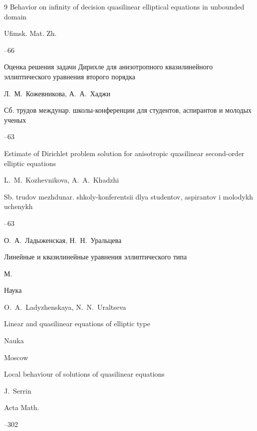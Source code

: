 \begin{thebibliography}{9}
\paper Behavior on infinity of decision quasilinear elliptical equations in unbounded domain

\jour Ufimsk. Mat. Zh.




--66






\paper Оценка решения задачи Дирихле для анизотропного квазилинейного эллиптического уравнения второго порядка

\by Л.~М.~Кожевникова, А.~А.~Хаджи

\jour Сб. трудов междунар. школы-конференции для студентов, аспирантов и молодых ученых



--63

\misctransl

\paper Estimate of Dirichlet problem solution  for anisotropic quasilinear second-order elliptic equations

 \by L.~M.~Kozhevnikova, A.~A.~Khadzhi  

\jour Sb. trudov mezhdunar. shkoly-konferentsii dlya studentov, aspirantov i molodykh uchenykh 



--63






\by О.~А.~Ладыженская, Н.~Н.~Уральцева

\book Линейные и квазилинейные уравнения эллиптического типа

\publaddr М.

\publ Наука



\misctransl

\by O.~A.~Ladyzhenskaya, N.~N.~Uraltseva 

\book Linear and quasilinear equations of elliptic type

\publ Nauka

\publaddr Moscow






\paper Local behaviour of solutions of quasilinear equations

\by J.~Serrin

\jour Acta Math.



--302



\end{thebibliography}





